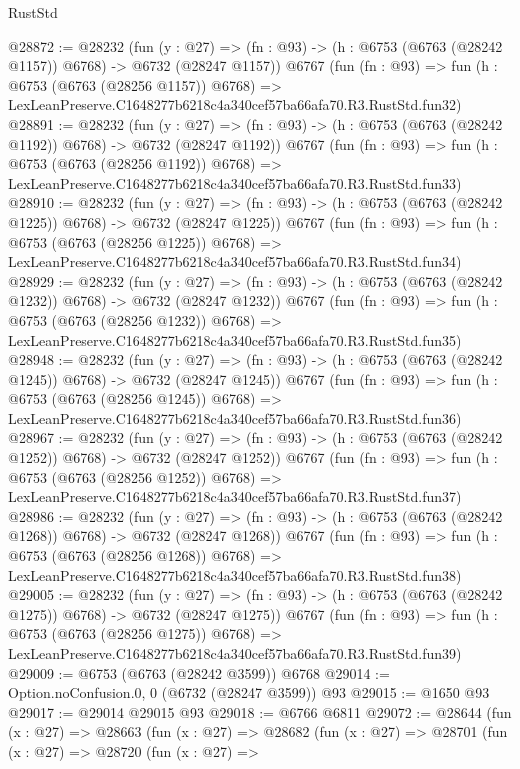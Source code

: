 \begin{lexlean}{RustStd}
\begin{coremodule}
@28872 := @28232
    (fun (y : @27) =>
    (fn : @93) -> (h : @6753 (@6763 (@28242 @1157)) @6768) -> @6732 (@28247 @1157))
    @6767
    (fun (fn : @93) =>
    fun (h : @6753 (@6763 (@28256 @1157)) @6768) =>
    LexLeanPreserve.C1648277b6218c4a340cef57ba66afa70.R3.RustStd.fun32)
@28891 := @28232
    (fun (y : @27) =>
    (fn : @93) -> (h : @6753 (@6763 (@28242 @1192)) @6768) -> @6732 (@28247 @1192))
    @6767
    (fun (fn : @93) =>
    fun (h : @6753 (@6763 (@28256 @1192)) @6768) =>
    LexLeanPreserve.C1648277b6218c4a340cef57ba66afa70.R3.RustStd.fun33)
@28910 := @28232
    (fun (y : @27) =>
    (fn : @93) -> (h : @6753 (@6763 (@28242 @1225)) @6768) -> @6732 (@28247 @1225))
    @6767
    (fun (fn : @93) =>
    fun (h : @6753 (@6763 (@28256 @1225)) @6768) =>
    LexLeanPreserve.C1648277b6218c4a340cef57ba66afa70.R3.RustStd.fun34)
@28929 := @28232
    (fun (y : @27) =>
    (fn : @93) -> (h : @6753 (@6763 (@28242 @1232)) @6768) -> @6732 (@28247 @1232))
    @6767
    (fun (fn : @93) =>
    fun (h : @6753 (@6763 (@28256 @1232)) @6768) =>
    LexLeanPreserve.C1648277b6218c4a340cef57ba66afa70.R3.RustStd.fun35)
@28948 := @28232
    (fun (y : @27) =>
    (fn : @93) -> (h : @6753 (@6763 (@28242 @1245)) @6768) -> @6732 (@28247 @1245))
    @6767
    (fun (fn : @93) =>
    fun (h : @6753 (@6763 (@28256 @1245)) @6768) =>
    LexLeanPreserve.C1648277b6218c4a340cef57ba66afa70.R3.RustStd.fun36)
@28967 := @28232
    (fun (y : @27) =>
    (fn : @93) -> (h : @6753 (@6763 (@28242 @1252)) @6768) -> @6732 (@28247 @1252))
    @6767
    (fun (fn : @93) =>
    fun (h : @6753 (@6763 (@28256 @1252)) @6768) =>
    LexLeanPreserve.C1648277b6218c4a340cef57ba66afa70.R3.RustStd.fun37)
@28986 := @28232
    (fun (y : @27) =>
    (fn : @93) -> (h : @6753 (@6763 (@28242 @1268)) @6768) -> @6732 (@28247 @1268))
    @6767
    (fun (fn : @93) =>
    fun (h : @6753 (@6763 (@28256 @1268)) @6768) =>
    LexLeanPreserve.C1648277b6218c4a340cef57ba66afa70.R3.RustStd.fun38)
@29005 := @28232
    (fun (y : @27) =>
    (fn : @93) -> (h : @6753 (@6763 (@28242 @1275)) @6768) -> @6732 (@28247 @1275))
    @6767
    (fun (fn : @93) =>
    fun (h : @6753 (@6763 (@28256 @1275)) @6768) =>
    LexLeanPreserve.C1648277b6218c4a340cef57ba66afa70.R3.RustStd.fun39)
@29009 := @6753 (@6763 (@28242 @3599)) @6768
@29014 := Option.noConfusion.{0, 0} (@6732 (@28247 @3599)) @93
@29015 := @1650 @93
@29017 := @29014 @29015 @93
@29018 := @6766 @6811
@29072 := @28644
    (fun (x : @27) =>
    @28663
      (fun (x : @27) =>
      @28682
        (fun (x : @27) =>
        @28701
          (fun (x : @27) =>
          @28720
            (fun (x : @27) =>

\end{coremodule}
\end{lexlean}

